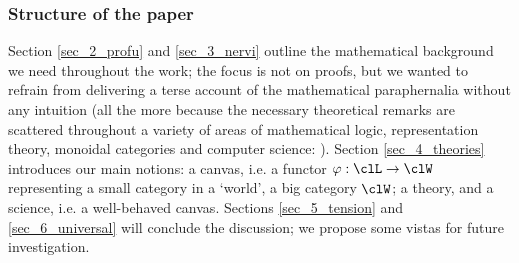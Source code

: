 \subsubsection*{Structure of the paper}
Section \ref{sec_2_profu} and \ref{sec_3_nervi} outline the mathematical background we need throughout the work; the focus is not on proofs, but we wanted to refrain from delivering a terse account of the mathematical paraphernalia without any intuition (all the more because the necessary theoretical remarks are scattered throughout a variety of areas of mathematical logic, representation theory, monoidal categories and computer science: \cite{benabou2000distributors,cattani2005profunctors,pickering2017profunctor,curiennone,tambara2006distributors}). Section \ref{sec_4_theories} introduces our main notions: a canvas, i.e. a functor $\phi : \clL \to \clW$ representing a small category in a `world', a big category $\clW$; a theory, and a science, i.e. a well-behaved canvas. Sections \ref{sec_5_tension} and \ref{sec_6_universal} will conclude the discussion; we propose some vistas for future investigation.